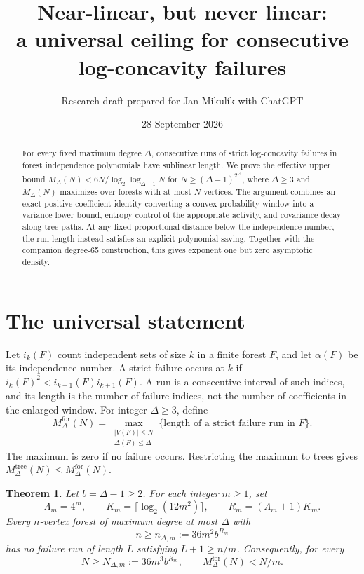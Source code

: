 \documentclass[11pt]{article}
\title{Near-linear, but never linear:\\a universal ceiling for consecutive log-concavity failures}
\author{Research draft prepared for Jan Mikul\'ik with ChatGPT}
\date{28 September 2026}
\newtheorem{theorem}{Theorem}
\begin{document}
\maketitle
\begin{abstract}
For every fixed maximum degree $\Delta$, consecutive runs of strict
log-concavity failures in forest independence polynomials have sublinear
length. We prove the effective upper bound
$M_\Delta(N)<6N/\log_2\log_{\Delta-1}N$ for
$N\ge(\Delta-1)^{2^{14}}$, where $\Delta\ge3$ and $M_\Delta(N)$ maximizes
over forests with at most $N$ vertices. The argument combines an exact
positive-coefficient identity converting a convex probability window
into a variance lower bound, entropy control of the appropriate activity,
and covariance decay along tree paths. At any fixed proportional distance
below the independence number, the run length instead satisfies an
explicit polynomial saving. Together with the companion degree-65
construction, this gives exponent one but zero asymptotic density.
\end{abstract}

\section{The universal statement}
Let $i_k(F)$ count independent sets of size $k$ in a finite forest $F$,
and let $\alpha(F)$ be its independence number. A strict failure occurs
at $k$ if $i_k(F)^2<i_{k-1}(F)i_{k+1}(F)$. A run is a consecutive
interval of such indices, and its length is the number of failure
indices, not the number of coefficients in the enlarged window.
For integer $\Delta\ge3$, define
\[
 M_\Delta^{\mathrm{for}}(N)=
 \max_{\substack{|V(F)|\le N\\\Delta(F)\le\Delta}}
 \{\text{length of a strict failure run in }F\}.
\]
The maximum is zero if no failure occurs. Restricting the maximum to
trees gives $M_\Delta^{\mathrm{tree}}(N)\le M_\Delta^{\mathrm{for}}(N)$.

\begin{theorem}\label{thm:finite}
Let $b=\Delta-1\ge2$. For each integer $m\ge1$, set
\begin{equation}\label{eq:thresholds}
 \Lambda_m=4^m,\qquad K_m=\lceil\log_2(12m^2)\rceil,\qquad
 R_m=(\Lambda_m+1)K_m.
\end{equation}
Every $n$-vertex forest of maximum degree at most $\Delta$ with
\[
 n\ge n_{\Delta,m}:=36m^2b^{R_m}
\]
has no failure run of length $L$ satisfying $L+1\ge n/m$.
Consequently, for every
\begin{equation}\label{eq:Nthreshold}
 N\ge N_{\Delta,m}:=36m^3b^{R_m},
 \qquad M_\Delta^{\mathrm{for}}(N)<N/m.
\end{equation}
\end{theorem}
\end{document}
